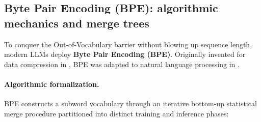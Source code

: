 \documentclass[../../main.tex]{subfiles}
\begin{document}
\subsection{Byte Pair Encoding (BPE): algorithmic mechanics and merge trees}
\label{subsec:bpe_algorithm}

To conquer the Out-of-Vocabulary barrier without blowing up sequence length, modern LLMs deploy \textbf{Byte Pair Encoding (BPE)}. Originally invented for data compression in \cite{gage1994}, BPE was adapted to natural language processing in \cite{sennrich2016}.

\paragraph{Algorithmic formalization.}
BPE constructs a subword vocabulary through an iterative bottom-up statistical merge procedure partitioned into distinct training and inference phases:
\end{document}
